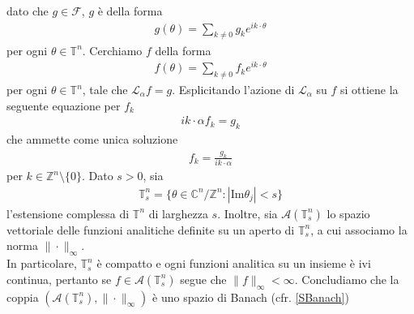 \documentclass[twoside, 11pt]{amsbook}
\makeatletter
\newcommand{\0}{{(0)}}
\newcommand{\3}{{(3)}}
\theoremstyle{colonplain}
\theoremstyle{colondefinition}
\theoremstyle{colonremark}
\numberwithin{equation}{chapter}
\renewcommand{\proofname}{Dimostrazione}
\renewenvironment{proof}[1][\proofname]{\par
  \pushQED{\qed}%
  \normalfont \topsep6\p@\@plus6\p@\relax
  \trivlist
  \item[\hskip\labelsep\bfseries #1:]\ignorespaces
}{%
  \popQED\endtrivlist\@endpefalse
}
\makeatother
\begin{document}
\begin{proof} dato che $g \in \mathscr{F}$, $g$ è della forma
\begin{align}
    g(\theta) = \sum_{k \neq 0} g_ke^{i k \cdot \theta}
\end{align}
per ogni $\theta \in \mathbb{T}^n$. Cerchiamo $f$ della forma
\begin{align}
    f(\theta) = \sum_{k \neq 0} f_ke^{i k \cdot \theta}
\end{align}
per ogni $\theta \in \mathbb{T}^n$, tale che $\mathcal{L}_\alpha f = g$. Esplicitando l'azione di $\mathcal{L}_\alpha$ su $f$ si ottiene la seguente equazione per $f_k$
\begin{align}
    i k \cdot \alpha f_k = g_k 
\end{align}
che ammette come unica soluzione
\begin{align}\label{UniqueSol}
    f_k = \frac{g_k}{i k \cdot \alpha}
\end{align}
per $k \in \mathbb{Z}^n \setminus \{0\}$. 
\end{proof}
Dato $s > 0$, sia
\begin{align}
    \mathbb{T}^n_s = \{\theta \in \mathbb{C}^n/\mathbb{Z}^n : |\mathrm{Im}\theta_j| < s\}
\end{align}
l'estensione complessa di $\mathbb{T}^n$ di larghezza $s$. Inoltre, sia $\mathcal{A}(\mathbb{T}^n_s)$ lo spazio vettoriale delle funzioni analitiche definite su un aperto di $\mathbb{T}^n_s$, a cui associamo la norma $\|\cdot\|_\infty$. \\
In particolare, $\mathbb{T}^n_s$ è compatto e ogni funzioni analitica su un insieme è ivi continua, pertanto se $f \in \mathcal{A}(\mathbb{T}^n_s)$ segue che $\|f\|_\infty < \infty$. Concludiamo che la coppia $(\mathcal{A}(\mathbb{T}^n_s), \|\cdot\|_\infty)$ è uno spazio di Banach (cfr. \cref{SBanach})
\end{document}
